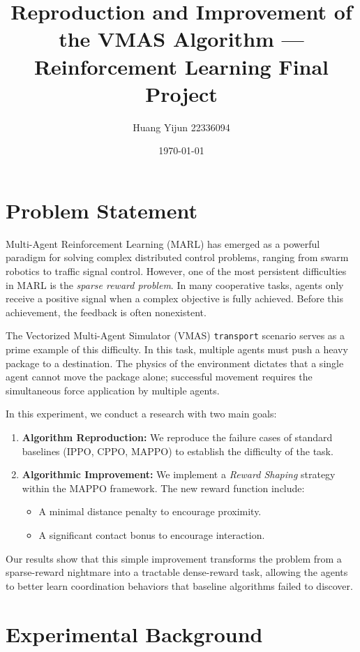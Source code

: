 \documentclass[12pt, a4paper]{article}
\title{\textbf{Reproduction and Improvement of the VMAS Algorithm — Reinforcement Learning Final Project}}
\author{Huang Yijun 22336094}
\date{\today}
\begin{document}
\maketitle

\section{Problem Statement}

Multi-Agent Reinforcement Learning (MARL) has emerged as a powerful paradigm for solving complex distributed control problems, ranging from swarm robotics to traffic signal control. However, one of the most persistent difficulties in MARL is the \textit{sparse reward problem}. In many cooperative tasks, agents only receive a positive signal when a complex objective is fully achieved. Before this achievement, the feedback is often nonexistent.

The Vectorized Multi-Agent Simulator (VMAS) \texttt{transport} scenario serves as a prime example of this difficulty. In this task, multiple agents must push a heavy package to a destination. The physics of the environment dictates that a single agent cannot move the package alone; successful movement requires the simultaneous force application by multiple agents.

In this experiment, we conduct a research with two main goals:
\begin{enumerate}
    \item \textbf{Algorithm Reproduction:} We reproduce the failure cases of standard baselines (IPPO, CPPO, MAPPO) to establish the difficulty of the task.
    \item \textbf{Algorithmic Improvement:} We implement a \textit{Reward Shaping} strategy within the MAPPO framework. The new reward function include:
    \begin{itemize}
        \item A minimal distance penalty to encourage proximity.
        \item A significant contact bonus to encourage interaction.
    \end{itemize}
\end{enumerate}

Our results show that this simple improvement transforms the problem from a sparse-reward nightmare into a tractable dense-reward task, allowing the agents to better learn coordination behaviors that baseline algorithms failed to discover.

\section{Experimental Background}
\end{document}
